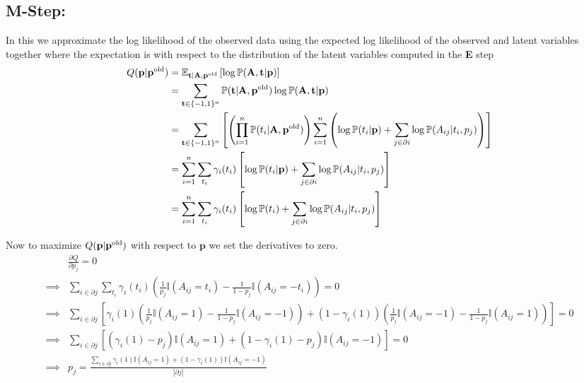 \documentclass[12pt,onecolumn,letterpaper]{article}
\begin{document}
\subsection*{M-Step:}
In this we approximate the log likelihood of the observed data using the expected log likelihood of the observed and latent variables together where the expectation is with respect to the distribution of the latent variables computed in the \textbf{E} step
\begin{align*}
Q(\textbf{p}|\textbf{p}^{{\rm old}}) &= 
\mathbb{E}_{
\textbf{t}|\textbf{A},\textbf{p}^{{\rm old}}
}
\left[
\log{
\mathbb{P}(\textbf{A},\textbf{t}|\textbf{p})
}
\right] \\
&=
\sum_{\textbf{t}\in \{-1,1\}^n} 
\mathbb{P}(\textbf{t}|\textbf{A},\textbf{p}^{{\rm old}})
\log{
\mathbb{P}(\textbf{A},\textbf{t}|\textbf{p})
} \\
&= 
\sum_{\textbf{t}\in \{-1,1\}^n}
\left[
\left(
\prod_{i=1}^{n} \mathbb{P}(t_i|\textbf{A},\textbf{p}^{{\rm old}})
\right)
\sum_{i=1}^{n}
\left(
\log{\mathbb{P}(t_i|\textbf{p})} +
\sum_{j\in \partial i} 
\log \mathbb{P}(A_{ij}|t_i,p_j) 
\right)
\right] \\
&=
\sum_{i=1}^{n}
\sum_{t_i} \gamma_i(t_i) 
\left[
\log{\mathbb{P}(t_i|\textbf{p})} +
\sum_{j\in \partial i} 
\log \mathbb{P}(A_{ij}|t_i,p_j) 
\right] \\
&=
\sum_{i=1}^{n}
\sum_{t_i} \gamma_i(t_i) 
\left[
\log{\mathbb{P}(t_i)} +
\sum_{j\in \partial i} 
\log \mathbb{P}(A_{ij}|t_i,p_j) 
\right]
\end{align*}

\noindent
Now to maximize $Q(\textbf{p}|\textbf{p}^{{\rm old}})$ with respect to $\textbf{p}$ we set the derivatives to zero.
\begin{align*}
& \frac{\partial{Q}}{\partial{p_j}} = 0 \\
\implies &
\sum_{i\in \partial j} 
\sum_{t_i} \gamma_i(t_i)
\left(
\frac{1}{p_j}\mathbb{I}(A_{ij}=t_i) -
\frac{1}{1-p_j}\mathbb{I}(A_{ij}=-t_i)
\right) 
= 0 \\
\implies &
\sum_{i\in \partial j} 
\left[
\gamma_i(1)
\left(
\frac{1}{p_j}\mathbb{I}(A_{ij}=1) -
\frac{1}{1-p_j}\mathbb{I}(A_{ij}=-1)
\right) +
\left(1-\gamma_i(1)\right)
\left(
\frac{1}{p_j}\mathbb{I}(A_{ij}=-1) -
\frac{1}{1-p_j}\mathbb{I}(A_{ij}=1)
\right) 
\right]
= 0 \\
\implies &
\sum_{i\in \partial j} 
\left[
\left(
\gamma_i(1)-p_j
\right) 
\mathbb{I}(A_{ij}=1) +
\left(
1-\gamma_i(1) - p_j
\right) 
\mathbb{I}(A_{ij}=-1)
\right] 
= 0 \\
\implies &
p_j = 
\frac{
\sum_{i\in \partial j} 
\gamma_i(1)
\mathbb{I}(A_{ij}=1) +
\left(
1-\gamma_i(1)
\right) 
\mathbb{I}(A_{ij}=-1)
}
{|\partial j|}
\end{align*}
\end{document}
